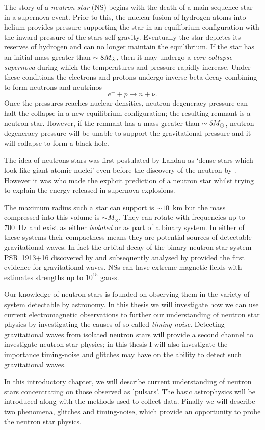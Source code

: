 The story of a \emph{neutron star} (NS) begins with the death of a main-sequence star
in a supernova event. Prior to this, the nuclear fusion of hydrogen atoms into
helium provides pressure supporting the star in an equilibrium configuration
with the inward pressure of the stars self-gravity. Eventually the star depletes
its reserves of hydrogen and can no longer maintain the equilibrium. If the
star has an initial mass greater than $\sim 8 M_{\odot}$, then it may undergo a
\emph{core-collapse supernova} during which the temperatures and pressure rapidly
increase. Under these conditions the electrons and protons undergo inverse
beta decay combining to form neutrons and neutrinos
\begin{equation}
    e^{-} + p \rightarrow n + \nu.
\end{equation}
Once the pressures reaches nuclear densities, neutron degeneracy pressure can
halt the collapse in a new equilibrium configuration; the resulting remnant is
a neutron star. However, if the remnant has a mass greater than $\sim 5 M_{\odot}$,
neutron degeneracy pressure will be unable to support the gravitational
pressure and it will collapse to form a black hole.

The idea of neutrons stars was first postulated by Landau as `dense stars
which look like giant atomic nuclei' \citep{Yakovlev2013} even before the
discovery of the neutron by \citep{Chadwick1932}. However it was
\citet{Baade1934} who made the explicit prediction of a neutron star whilst
trying to explain the energy released in supernova explosions.

The maximum radius such a star can support is $\sim 10$~km but the mass
compressed into this volume is $\sim M_{\odot}$.  They can rotate with
frequencies up to 700~Hz and exist as either \emph{isolated} or as part of a
binary system.  In either of these systems their compactness means they are
potential sources of detectable gravitational waves. In fact the orbital decay
of the binary neutron star system PSR~1913+16 discovered by \citet{Hulse1975}
and subsequently analysed by \citet{Taylor1982} provided the first evidence for
gravitational waves.  NSs can have extreme magnetic fields with estimates
strengths up to $10^{15}$ gauss. 

Our knowledge of neutron stars is founded on observing them in the variety of
system detectable by astronomy. In this thesis we will investigate how we can
use current electromagnetic observations to further our understanding of neutron
star physics by investigating the causes of so-called \emph{timing-noise}.
Detecting gravitational waves from isolated neutron stars will provide a second
channel to investigate neutron star physics; in this thesis I will also
investigate the importance timing-noise and glitches may have on the ability to
detect such gravitational waves.

In this introductory chapter, we will describe current understanding of neutron
stars concentrating on those observed as 'pulsars'. The basic astrophysics will
be introduced along with the methods used to collect data. Finally we will describe
two phenomena, glitches and timing-noise, which provide an opportunity to
probe the neutron star physics.

